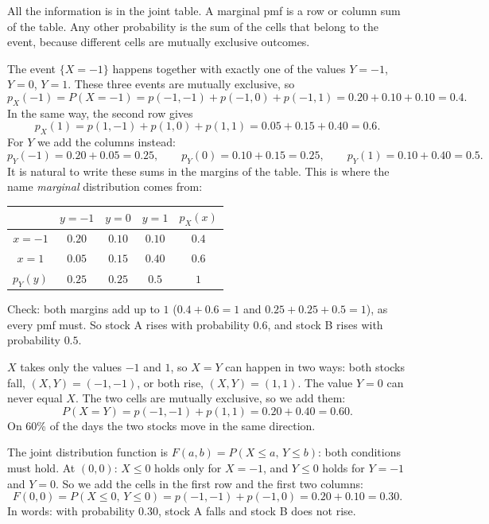 \begin{solution}
	\idea All the information is in the joint table. A marginal pmf is a row
	or column sum of the table. Any other probability is the sum of the cells
	that belong to the event, because different cells are mutually exclusive
	outcomes.

	 The event $\{X=-1\}$ happens together with exactly one of the
	values $Y=-1$, $Y=0$, $Y=1$. These three events are mutually exclusive,
	so
	\[ p_X(-1)=P(X=-1)=p(-1,-1)+p(-1,0)+p(-1,1)=0.20+0.10+0.10=0.4. \]
	In the same way, the second row gives
	\[ p_X(1)=p(1,-1)+p(1,0)+p(1,1)=0.05+0.15+0.40=0.6. \]
	For $Y$ we add the columns instead:
	\[ p_Y(-1)=0.20+0.05=0.25,\qquad p_Y(0)=0.10+0.15=0.25,\qquad
		p_Y(1)=0.10+0.40=0.5. \]
	It is natural to write these sums in the margins of the table. This is
	where the name \emph{marginal} distribution comes from:
	\begin{center}
		\renewcommand{\arraystretch}{1.25}
		\begin{tabular}{c|ccc|c}
			         & $y=-1$ & $y=0$  & $y=1$  & $p_X(x)$ \\
			\hline
			$x=-1$   & $0.20$ & $0.10$ & $0.10$ & $0.4$ \\
			$x=1$    & $0.05$ & $0.15$ & $0.40$ & $0.6$ \\
			\hline
			$p_Y(y)$ & $0.25$ & $0.25$ & $0.5$  & $1$
		\end{tabular}
	\end{center}
	Check: both margins add up to $1$ ($0.4+0.6=1$ and $0.25+0.25+0.5=1$),
	as every pmf must. So stock A rises with probability $0.6$, and stock B
	rises with probability $0.5$.

	 $X$ takes only the values $-1$ and $1$, so $X=Y$ can happen in
	two ways: both stocks fall, $(X,Y)=(-1,-1)$, or both rise,
	$(X,Y)=(1,1)$. The value $Y=0$ can never equal $X$. The two cells are
	mutually exclusive, so we add them:
	\[ P(X=Y)=p(-1,-1)+p(1,1)=0.20+0.40=0.60. \]
	On 60\% of the days the two stocks move in the same direction.

	 The joint distribution function is
	$F(a,b)=P(X\le a,\,Y\le b)$: both conditions must hold. At $(0,0)$:
	$X\le0$ holds only for $X=-1$, and $Y\le0$ holds for $Y=-1$ and $Y=0$. So
	we add the cells in the first row and the first two columns:
	\[ F(0,0)=P(X\le0,\,Y\le0)=p(-1,-1)+p(-1,0)=0.20+0.10=0.30. \]
	In words: with probability $0.30$, stock A falls and stock B does not
	rise.


\end{solution}

